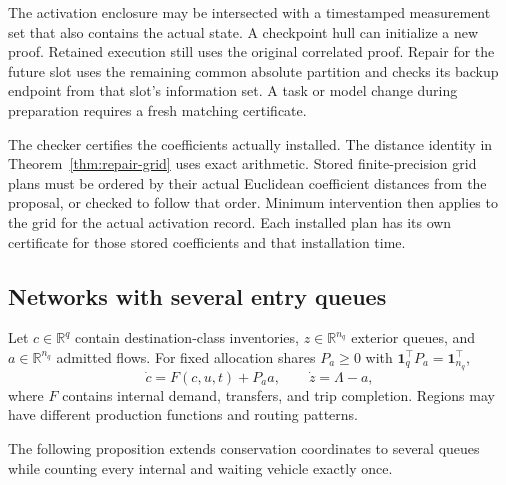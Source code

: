 \documentclass[preprint,12pt]{elsarticle}
\newcommand{\R}{\mathbb{R}}
\begin{document}
The activation enclosure may be intersected with a timestamped measurement
set that also contains the actual state. A checkpoint hull can initialize
a new proof. Retained execution still uses the original correlated proof.
Repair for the future slot uses the remaining common absolute partition
and checks its backup endpoint from that slot's information set. A task
or model change during preparation requires a fresh matching certificate.

The checker certifies the coefficients actually installed. The distance
identity in Theorem~\ref{thm:repair-grid} uses exact arithmetic. Stored
finite-precision grid plans must be ordered by their actual Euclidean
coefficient distances from the proposal, or checked to follow that order.
Minimum intervention then applies to the grid for the actual activation
record. Each installed plan has its own certificate for those stored
coefficients and that installation time.

\subsection{Networks with several entry queues}
\label{sec:network-extension}

Let $c\in\R^q$ contain destination-class inventories, $z\in\R^{n_q}$ exterior
queues, and $a\in\R^{n_q}$ admitted flows. For fixed allocation shares
$P_a\ge0$ with $\mathbf1_q^\top P_a=\mathbf1_{n_q}^\top$,
\begin{equation}
 \dot c=F(c,u,t)+P_a a,\qquad \dot z=\Lambda-a,
 \label{eq:network-class-queue}
\end{equation}
where $F$ contains internal demand, transfers, and trip completion. Regions
may have different production functions and routing patterns.

The following proposition extends conservation coordinates to several
queues while counting every internal and waiting vehicle exactly once.
\end{document}
